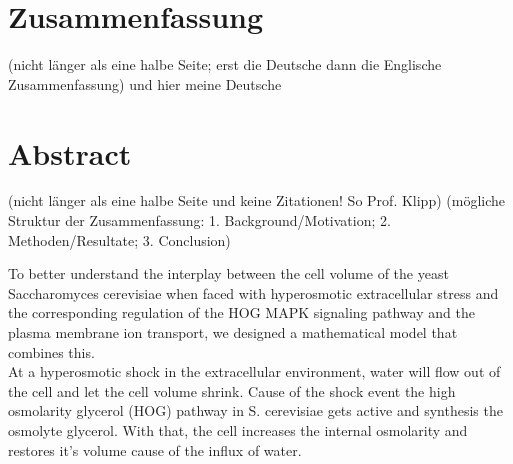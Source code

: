 \section{Zusammenfassung}
(nicht länger als eine halbe Seite; erst die Deutsche dann die Englische Zusammenfassung)
und hier meine Deutsche


\section{Abstract}


(nicht länger als eine halbe Seite und keine Zitationen! So Prof. Klipp)
(mögliche Struktur der Zusammenfassung: 1. Background/Motivation; 2. Methoden/Resultate; 3. Conclusion)


To better understand the interplay between the cell volume of the yeast Saccharomyces cerevisiae when faced with hyperosmotic extracellular stress and the corresponding regulation of the HOG MAPK signaling pathway and the plasma membrane ion transport, we designed a mathematical model that combines this.  \\
At a hyperosmotic shock in the extracellular environment, water will flow out of the cell and let the cell volume shrink. Cause of the shock event the high osmolarity glycerol (HOG) pathway in S. cerevisiae gets active and synthesis the osmolyte glycerol. With that, the cell increases the internal osmolarity and restores it’s volume cause of the influx of water.

\newpage